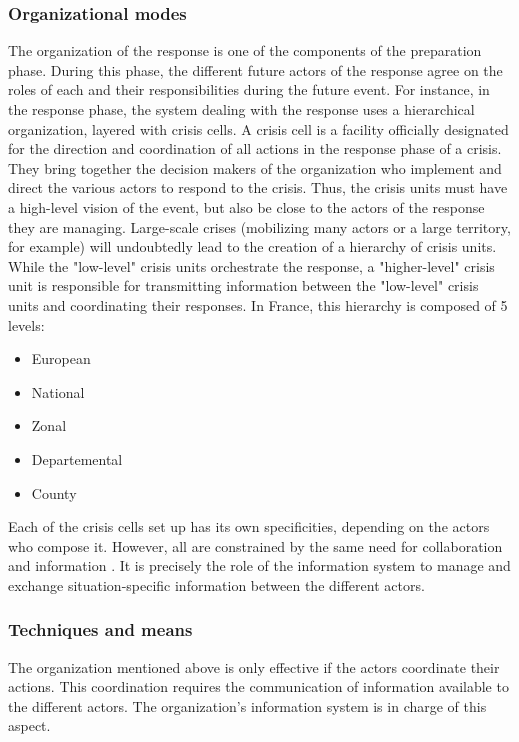 \subsubsection{Organizational modes}
The organization of the response is one of the components of the preparation phase.
During this phase, the different future actors of the response agree on the roles of each and their responsibilities during the future event.
For instance, in the response phase, the system dealing with the response uses a hierarchical organization, layered with crisis cells.
A crisis cell is a facility officially designated for the direction and coordination of all actions in the response phase of a crisis.
They bring together the decision makers of the organization who implement and direct the various actors to respond to the crisis.
Thus, the crisis units must have a high-level vision of the event, but also be close to the actors of the response they are managing.
Large-scale crises (mobilizing many actors or a large territory, for example) will undoubtedly lead to the creation of a hierarchy of crisis units.
While the "low-level" crisis units orchestrate the response, a "higher-level" crisis unit is responsible for transmitting information between the "low-level" crisis units and coordinating their responses.
In France, this hierarchy is composed of 5 levels:

\begin{itemize}
    \item European
    \item National
    \item Zonal
    \item Departemental
    \item County
\end{itemize}

Each of the crisis cells set up has its own specificities, depending on the actors who compose it.
However, all are constrained by the same need for collaboration \cite{benabenAIFrameworkMetamodel2020,comfortCrisisManagementHindsight2007} and information \cite{comfortCrisisManagementHindsight2007,endsleyTheorySituationAwareness1995}.
It is precisely the role of the information system to manage and exchange situation-specific information between the different actors.

\subsubsection{Techniques and means}
The organization mentioned above is only effective if the actors coordinate their actions.
This coordination requires the communication of information available to the different actors.
The organization's information system is in charge of this aspect.


